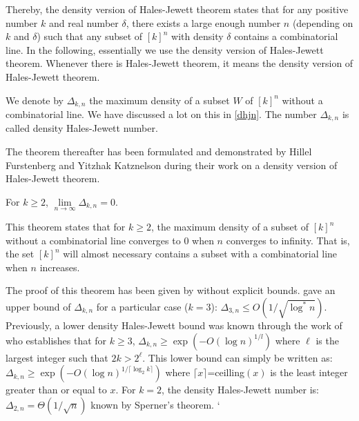 Thereby, the density version of Hales-Jewett theorem states that for any positive number $k$ and real number $\delta$,  there exists a large enough number $n$ (depending on $k$ and $\delta$) such that  any subset of  $[k]^n $ with density $\delta$ contains a combinatorial line.
In the following, essentially  we use  the density version of  Hales-Jewett theorem. Whenever there is Hales-Jewett theorem, it means the density version of Hales-Jewett theorem.

We denote by $\Delta_{k,n}$ the maximum density of a subset $W$ of $[k]^n$ without a combinatorial line. We have discussed a lot on this in \eqref{dhjn}. The number $\Delta_{k,n}$ is called density Hales-Jewett number.

The theorem thereafter has been formulated and demonstrated  by Hillel Furstenberg and Yitzhak Katznelson  during their work on a density version of Hales-Jewett theorem. 

\begin{thm}	For $k\geq 2$, $\lim\limits_{n\longrightarrow \infty} \Delta_{k,n}=0.$ \label{fk}	\end{thm}
 
This theorem states that for $k\geq 2$, the maximum  density of a subset of $[k]^n$ without a combinatorial line converges to $0$ when $n$ converges to infinity. That is,  the set $[k]^n$ will almost necessary contains a subset with a combinatorial line when $n$ increases.

The proof of this theorem has been given by \cite{furstenberg1991density} without explicit bounds. \cite{polymath2012new} gave an upper bound of $\Delta_{k,n}$ for a particular case ($k=3$): $\Delta_{3,n} \leq O(1/\sqrt{\log^* n}).$ Previously, a lower  density Hales-Jewett bound  was known through the work of \cite{polymath2010density} who establishes that  for $k\geq 3$, $\Delta_{k,n} \geq \exp \left(-O(\log n)^{1/l}\right)$ where $\ell$ is the largest integer such that $2k > 2^{\ell}$. This lower bound can simply be written as: $\Delta_{k,n} \geq \exp \left(-O(\log n)^{1/\lceil \log_2 k \rceil}\right)$ where $\lceil x \rceil$=ceilling$(x)$ is the least integer greater than or equal to $x.$ For $k=2$, the density Hales-Jewett number is: $\Delta_{2,n}=\Theta(1/\sqrt{n})$ known by Sperner's theorem.
`

